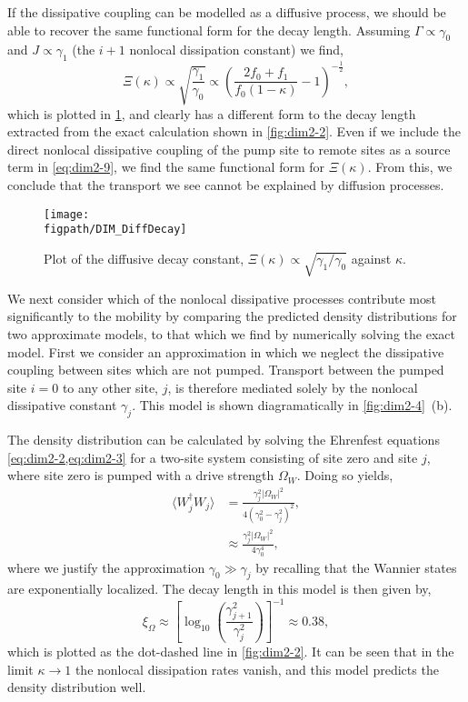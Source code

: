 If the dissipative coupling can be modelled as a diffusive process, we should be able to recover the same functional form for the decay length. Assuming \(\Gamma \propto \gamma_{0}\) and \(J \propto \gamma_{1}\) (the \(i+1\) nonlocal dissipation constant) we find,
\begin{equation}
	\Xi(\kappa) \propto \sqrt{\frac{\gamma_{1}}{\gamma_{0}}} \propto \left(\frac{2f_{0} + f_{1}}{f_{0}(1-\kappa)} - 1\right)^{-\frac{1}{2}},
	\label{eq:dim2-11}
\end{equation}
which is plotted in \cref{fig:dim2-5}, and clearly has a different form to the decay length extracted from the exact calculation shown in \cref{fig:dim2-2}. Even if we include the direct nonlocal dissipative coupling of the pump site to remote sites as a source term in \cref{eq:dim2-9}, we find the same functional form for \(\Xi(\kappa)\). From this, we conclude that the transport we see cannot be explained by diffusion processes.

\begin{figure}[ht!]
\centering
\texttt{[image: \\figpath/DIM\_DiffDecay]}
\caption{\label{fig:dim2-5}Plot of the diffusive decay constant, \(\Xi(\kappa) \propto \sqrt{\gamma_{1}/\gamma_{0}}\) against \(\kappa\).}
\end{figure}

We next consider which of the nonlocal dissipative processes contribute most significantly to the mobility by comparing the predicted density distributions for two approximate models, to that which we find by numerically solving the exact model. First we consider an approximation in which we neglect the dissipative coupling between sites which are not pumped. Transport between the pumped site \(i=0\) to any other site, \(j\), is therefore mediated solely by the nonlocal dissipative constant \(\gamma_{j}\). This model is shown diagramatically in \cref{fig:dim2-4}~(b).

The density distribution can be calculated by solving the Ehrenfest equations \cref{eq:dim2-2,eq:dim2-3} for a two-site system consisting of site zero and site \(j\), where site zero is pumped with a drive strength \(\Omega_{W}\). Doing so yields,
\begin{align}
	\langle W_{j}^{\dagger}W_{j} \rangle &= \frac{\gamma_{j}^{2}|\Omega_{W}|^{2}}{4(\gamma_{0}^{2} - \gamma_{j}^{2})^{2}}, \label{eq:dim2-12} \\
	&\approx \frac{\gamma_{j}^{2}|\Omega_{W}|^{2}}{4\gamma_{0}^{4}}, \label{eq:dim2-13}
\end{align}
where we justify the approximation \(\gamma_{0} \gg \gamma_{j}\) by recalling that the Wannier states are exponentially localized. The decay length in this model is then given by,
\begin{equation}
	\xi_{\Omega} \approx \left[ \log_{10}\left(\frac{\gamma_{j+1}^{2}}{\gamma_{j}^{2}}\right)\right]^{-1} \approx 0.38,
	\label{eq:dim2-14}
\end{equation}
which is plotted as the dot-dashed line in \cref{fig:dim2-2}. It can be seen that in the limit \(\kappa \rightarrow 1\) the nonlocal dissipation rates vanish, and this model predicts the density distribution well.

